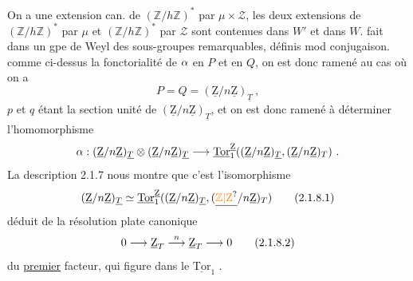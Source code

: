 On a une extension can. de $(\mathbb Z/h\mathbb Z)^*$ par $\mu\times\mathcal Z$, les deux extensions  de $(\mathbb Z/h\mathbb Z)^*$ par $\mu$ et $(\mathbb Z/h\mathbb Z)^*$ par $\mathcal Z$ sont contenues  dans $W'$ et dans $W$.  fait dans un gpe de Weyl des sous-groupes remarquables, définis mod conjugaison.
comme ci-dessus la fonctorialité de $\alpha$ en $P$ et en $Q$, on est donc ramené au cas où on a 
\[
P=Q=(\underline{\mathrm Z}/n\underline{\mathrm Z})_{\underline{T}}\ ,
\]
$p$ et $q$ étant la section unité de $(\underline{\mathrm Z}/n\underline{\mathrm Z})_{\underline{T}}$, et on est donc ramené à déterminer l'homomorphisme
\[
\handwritten{\alpha}:(\underline{\mathrm Z}/n\underline{\mathrm Z})_{\underline{T}}\otimes(\underline{\mathrm Z}/n\underline{\mathrm Z})_{\underline{T}}\handwritten{\longrightarrow}\underline{\mathrm{Tor}}_1^{\underline{\mathrm Z}}((\underline{\mathrm Z}/n\underline{\mathrm Z})_{\underline{T}},(\underline{\mathrm Z}/n\underline{\mathrm Z})_T)\ .
\]
La description 2.1.7 nous montre que c'est l'isomorphisme
\[
(\underline{\mathrm Z}/n\underline{\mathrm Z})_{\handwritten{\underline T}}\handwritten{\simeq}\underline{\mathrm{Tor}}_1^{\underline{\mathrm Z}}((\underline{\mathrm Z}/n\underline{\mathrm Z})_{\underline{T}},(\underline{\unsure{\mathbb Z|\mathrm Z}}/n\underline{\mathrm Z})_T)\tag*{(2.1.8.1)}
\]
déduit de la résolution plate canonique
\[
0\handwritten{\longrightarrow}\underline{\mathrm Z}_T\mathrel{\mathop{\handwritten{\longrightarrow}}\limits^{n}}\underline{\mathrm Z}_T\handwritten{\longrightarrow}0\tag*{\handwritten{(2.1.8.2)}}
\]
du \uline{premier} facteur,  qui figure dans le $\underline{\mathrm{Tor}}_1$ .

